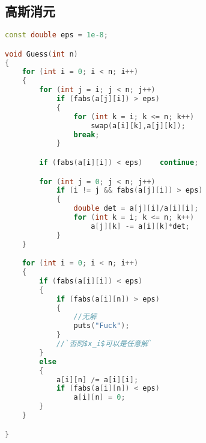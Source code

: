 \subsection{高斯消元}
	\begin{lstlisting}[language=c++]
const double eps = 1e-8;

void Guess(int n)
{
	for (int i = 0; i < n; i++)
	{
		for (int j = i; j < n; j++)
			if (fabs(a[j][i]) > eps)
			{
				for (int k = i; k <= n; k++)
					swap(a[i][k],a[j][k]);
				break;
			}

		if (fabs(a[i][i]) < eps)	continue;

		for (int j = 0; j < n; j++)
			if (i != j && fabs(a[j][i]) > eps)
			{
				double det = a[j][i]/a[i][i];
				for (int k = i; k <= n; k++)
					a[j][k] -= a[i][k]*det;
			}
	}

	for (int i = 0; i < n; i++)
	{
		if (fabs(a[i][i]) < eps)
		{
			if (fabs(a[i][n]) > eps)
			{
				//无解
				puts("Fuck");
			}
			//`否则$x_i$可以是任意解`
		}
		else
		{
			a[i][n] /= a[i][i];
			if (fabs(a[i][n]) < eps)
				a[i][n] = 0;
		}
	}

}
	\end{lstlisting}

